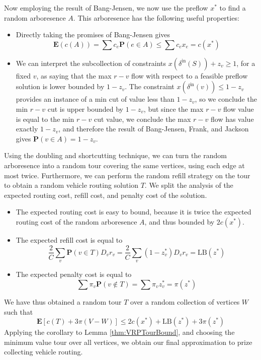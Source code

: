 \documentclass{article}
\theoremstyle{plain}
\theoremstyle{plain}
\begin{document}
Now employing the result of Bang-Jensen, we now use the preflow $x^*$ to find a random arboresence $A$. This arboresence has the following useful properties:
%
\begin{itemize}
    \item Directly taking the promises of Bang-Jensen gives
    \[ \mathbf{E}(c(A)) = \sum c_e \mathbf{P}(e \in A) \leq \sum c_e x_e = c(x^*) \]

    \item We can interpret the subcollection of constraints $x(\delta^{\text{in}}(S)) + z_v \geq 1$, for a fixed $v$, as saying that the max $r-v$ flow with respect to a feasible preflow solution is lower bounded by $1 - z_v$. The constraint $x(\delta^{\text{in}}(v)) \leq 1 - z_v$ provides an instance of a min cut of value less than $1 - z_v$, so we conclude the min $r-v$ cut is upper bounded by $1 - z_v$, but since the max $r-v$ flow value is equal to the min $r-v$ cut value, we conclude the max $r-v$ flow has value exactly $1 - z_v$, and therefore the result of Bang-Jensen, Frank, and Jackson gives $\mathbf{P}(v \in A) = 1 - z_v$.

\end{itemize}

Using the doubling and shortcutting technique, we can turn the random arboresence into a random tour covering the same vertices, using each edge at most twice. Furthermore, we can perform the random refill strategy on the tour to obtain a random vehicle routing solution $T$. We split the analysis of the expected routing cost, refill cost, and penalty cost of the solution.
%
\begin{itemize}
    \item The expected routing cost is easy to bound, because it is twice the expected routing cost of the random arboresence $A$, and thus bounded by $2c(x^*)$.

    \item The expected refill cost is equal to
    \[ \frac{2}{C} \sum_v \mathbf{P}(v \in T) D_v r_v = \frac{2}{C} \sum_v (1 - z^*_v) D_vr_v = \text{LB}(z^*) \]

    \item The expected penalty cost is equal to
    \[ \sum \pi_v \mathbf{P}(v \not \in T) = \sum \pi_vz^*_v = \pi(z^*) \]
\end{itemize}
%
We have thus obtained a random tour $T$ over a random collection of vertices $W$ such that
%
\[ \mathbf{E}[c(T) + 3\pi(V - W)] \leq 2c(x^*) + \text{LB}(z^*) + 3\pi(z^*) \]
%
Applying the corollary to Lemma \ref{thm:VRPTourBound}, and choosing the minimum value tour over all vertices, we obtain our final approximation to prize collecting vehicle routing.
\end{document}
